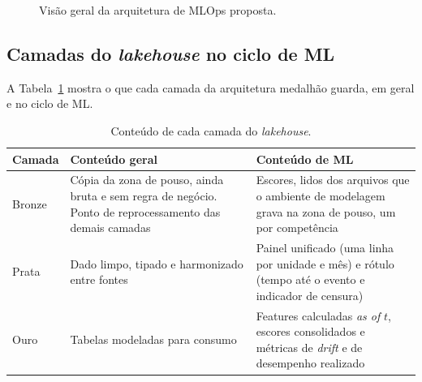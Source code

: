 \begin{figure}[htbp]
{%
	}
	\caption{Visão geral da arquitetura de MLOps proposta.}
	\label{fig:arquitetura}
\end{figure}

\subsection{Camadas do \textit{lakehouse} no ciclo de ML}

A Tabela~\ref{tab:camadas} mostra o que cada camada da arquitetura medalhão guarda, em geral e no ciclo de ML.

\begin{table}[htbp]
	\centering
	\caption{Conteúdo de cada camada do \textit{lakehouse}.}
	\label{tab:camadas}
	\small
	\begin{tabularx}{\textwidth}{@{}>{\raggedright\arraybackslash}p{1.6cm}>{\raggedright\arraybackslash}X>{\raggedright\arraybackslash}X@{}}
		\toprule
		\textbf{Camada} & \textbf{Conteúdo geral} & \textbf{Conteúdo de ML} \\
		\midrule
		Bronze & Cópia da zona de pouso, ainda bruta e sem regra de negócio. Ponto de reprocessamento das demais camadas & Escores, lidos dos arquivos que o ambiente de modelagem grava na zona de pouso, um por competência \\
		Prata & Dado limpo, tipado e harmonizado entre fontes & Painel unificado (uma linha por unidade e mês) e rótulo (tempo até o evento e indicador de censura) \\
		Ouro & Tabelas modeladas para consumo & Features calculadas \textit{as of} $t$, escores consolidados e métricas de \textit{drift} e de desempenho realizado \\
		\bottomrule
	\end{tabularx}
\end{table}

